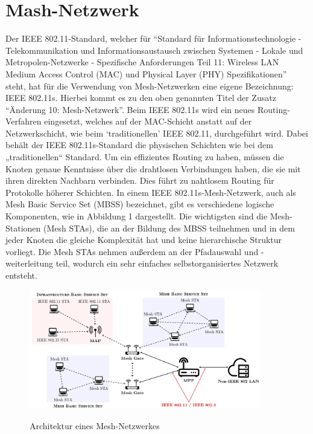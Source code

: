\documentclass[12pt, a4paper, onecolumn, oneside, toc=bibliographynumbered, liststotoc]{scrreprt} %
\begin{document}
		\section{Mash-Netzwerk}
            Der IEEE 802.11-Standard, welcher für \enquote{Standard für Informationstechnologie - Telekommunikation und Informationsaustausch zwischen Systemen - Lokale und Metropolen-Netzwerke - Spezifische Anforderungen Teil 11: Wireless LAN Medium Access Control (MAC) und Physical Layer (PHY) Spezifikationen} steht, hat für die Verwendung von Mesh-Netzwerken eine eigene Bezeichnung: IEEE 802.11s. Hierbei kommt es zu den oben genannten Titel der Zusatz \enquote{Änderung 10: Mesh-Netzwerk}. Beim IEEE 802.11s wird ein neues Routing-Verfahren eingesetzt, welches auf der MAC-Schicht anstatt auf der Netzwerkschicht, wie beim \enquote*{traditionellen} IEEE 802.11, durchgeführt wird. Dabei behält der IEEE 802.11s-Standard die physischen Schichten wie bei dem „traditionellen“ Standard. Um ein effizientes Routing zu haben, müssen die Knoten genaue Kenntnisse über die drahtlosen Verbindungen haben, die sie mit ihren direkten Nachbarn verbinden. Dies führt zu nahtlosem Routing für Protokolle höherer Schichten. In einem IEEE 802.11s-Mesh-Netzwerk, auch als Mesh Basic Service Set (MBSS) bezeichnet, gibt es verschiedene logische Komponenten, wie in Abbildung 1 dargestellt. Die wichtigsten sind die Mesh-Stationen (Mesh STAs), die an der Bildung des MBSS teilnehmen und in dem jeder Knoten die gleiche Komplexität hat und keine hierarchische Struktur vorliegt. Die Mesh STAs nehmen außerdem an der Pfadauswahl und -weiterleitung teil, wodurch ein sehr einfaches selbstorganisiertes Netzwerk entsteht.

            \begin{figure}[htpb]
           	\centering
	           \caption{Architektur eines Mesh-Netzwerkes}
	           \includegraphics[width=0.9\textwidth]{MeshNetwork}
		\label{Mesh}
            \end{figure}    
\end{document}
